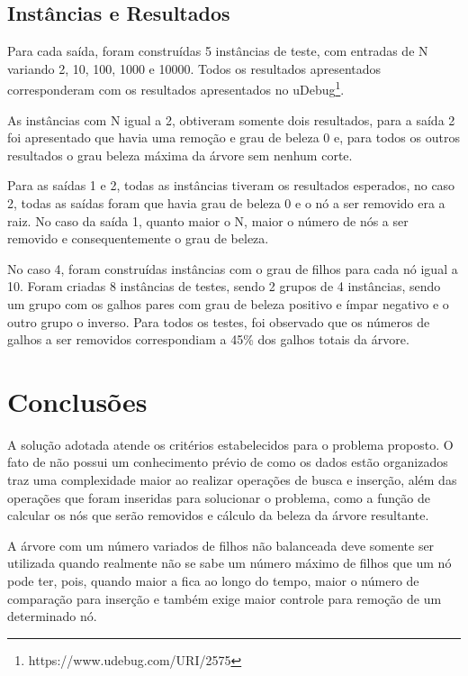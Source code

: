 \documentclass[12pt]{article}
\begin{document}
\subsection{Instâncias e Resultados}

Para cada saída, foram construídas 5 instâncias de teste, com entradas de N variando 2, 10, 100, 1000 e 10000. Todos os resultados apresentados corresponderam com os resultados apresentados no uDebug\footnote{https://www.udebug.com/URI/2575}. 

As instâncias com N igual a 2, obtiveram somente dois resultados, para a saída 2 foi apresentado que havia uma remoção e grau de beleza 0 e, para todos os outros resultados o grau beleza máxima da árvore sem nenhum corte.

Para as saídas 1 e 2, todas as instâncias tiveram os resultados esperados, no caso 2, todas as saídas foram que havia grau de beleza 0 e o nó a ser removido era a raiz. No caso da saída 1, quanto maior o N, maior o número de nós a ser removido e consequentemente o grau de beleza.

No caso 4, foram construídas instâncias com o grau de filhos para cada nó igual a 10. Foram criadas 8 instâncias de testes, sendo 2 grupos de 4 instâncias, sendo um grupo com os galhos pares com grau de beleza positivo e ímpar negativo e o outro grupo o inverso. Para todos os testes, foi observado que os números de galhos a ser removidos correspondiam a 45\% dos galhos totais da árvore.


\section{Conclusões}\label{sec:conclusão}

A solução adotada atende os critérios estabelecidos para o problema proposto. O fato de não possui um conhecimento prévio de como os dados estão organizados traz uma complexidade maior ao realizar operações de busca e inserção, além das operações que foram inseridas para solucionar o problema, como a função de calcular os nós que serão removidos e cálculo da beleza da árvore resultante. 

A árvore com um número variados de filhos não balanceada deve somente ser utilizada quando realmente não se sabe um número máximo de filhos que um nó pode ter, pois, quando maior a fica ao longo do tempo, maior o número de comparação para inserção e também exige maior controle para remoção de um determinado nó.



\end{document}
